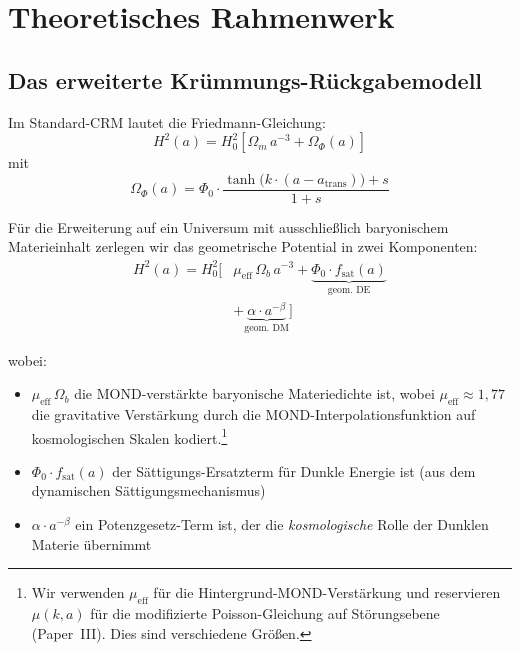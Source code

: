 \documentclass[aps,prd,twocolumn,superscriptaddress,nofootinbib]{revtex4-2}
\begin{document}
\section{Theoretisches Rahmenwerk}
\label{sec:theory}

\subsection{Das erweiterte Kr\"ummungs-R\"uckgabemodell}

Im Standard-CRM \cite{Geiger2026} lautet die Friedmann-Gleichung:
\begin{equation}
H^2(a) = H_0^2 \left[\Omega_m\,a^{-3} + \Omega_\Phi(a)\right]
\end{equation}
mit
\begin{equation}
\Omega_\Phi(a) = \Phi_0 \cdot \frac{\tanh\!\big(k\cdot(a - a_{\mathrm{trans}})\big) + s}{1 + s}
\end{equation}

F\"ur die Erweiterung auf ein Universum mit ausschlie\ss{}lich baryonischem Materieinhalt zerlegen wir das geometrische Potential in zwei Komponenten:
\begin{equation}
\begin{split}
H^2(a) = H_0^2 \Big[&\mu_{\mathrm{eff}}\,\Omega_b\,a^{-3} + \underbrace{\Phi_0 \cdot f_{\mathrm{sat}}(a)}_{\text{geom.\ DE}} \\
&+ \underbrace{\alpha \cdot a^{-\beta}}_{\text{geom.\ DM}}\Big]
\end{split}
\label{eq:extended_cfm}
\end{equation}

wobei:
\begin{itemize}
\item $\mu_{\mathrm{eff}}\,\Omega_b$ die MOND-verst\"arkte baryonische Materiedichte ist, wobei $\mu_{\mathrm{eff}} \approx 1{,}77$ die gravitative Verst\"arkung durch die MOND-Interpolationsfunktion auf kosmologischen Skalen kodiert.\footnote{Wir verwenden $\mu_{\mathrm{eff}}$ f\"ur die Hintergrund-MOND-Verst\"arkung und reservieren $\mu(k,a)$ f\"ur die modifizierte Poisson-Gleichung auf St\"orungsebene (Paper~III). Dies sind verschiedene Gr\"o\ss{}en.}
\item $\Phi_0 \cdot f_{\mathrm{sat}}(a)$ der S\"attigungs-Ersatzterm f\"ur Dunkle Energie ist (aus dem dynamischen S\"attigungsmechanismus)
\item $\alpha \cdot a^{-\beta}$ ein Potenzgesetz-Term ist, der die \textit{kosmologische} Rolle der Dunklen Materie \"ubernimmt
\end{itemize}
\end{document}
